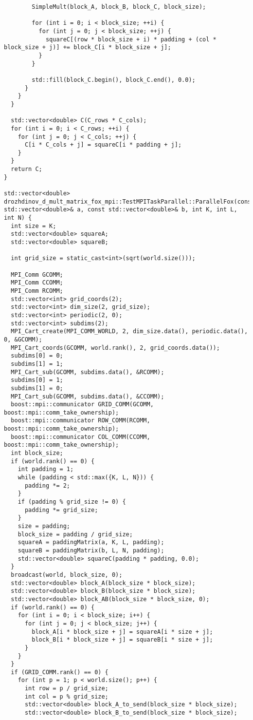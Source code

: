 \documentclass{report}
\begin{document}
\begin{lstlisting}
        SimpleMult(block_A, block_B, block_C, block_size);

        for (int i = 0; i < block_size; ++i) {
          for (int j = 0; j < block_size; ++j) {
            squareC[(row * block_size + i) * padding + (col * block_size + j)] += block_C[i * block_size + j];
          }
        }

        std::fill(block_C.begin(), block_C.end(), 0.0);
      }
    }
  }

  std::vector<double> C(C_rows * C_cols);
  for (int i = 0; i < C_rows; ++i) {
    for (int j = 0; j < C_cols; ++j) {
      C[i * C_cols + j] = squareC[i * padding + j];
    }
  }
  return C;
}

std::vector<double> drozhdinov_d_mult_matrix_fox_mpi::TestMPITaskParallel::ParallelFox(const std::vector<double>& a, const std::vector<double>& b, int K, int L, int N) {
  int size = K;
  std::vector<double> squareA;
  std::vector<double> squareB;

  int grid_size = static_cast<int>(sqrt(world.size()));

  MPI_Comm GCOMM;
  MPI_Comm CCOMM;
  MPI_Comm RCOMM;
  std::vector<int> grid_coords(2);
  std::vector<int> dim_size(2, grid_size);
  std::vector<int> periodic(2, 0);
  std::vector<int> subdims(2);
  MPI_Cart_create(MPI_COMM_WORLD, 2, dim_size.data(), periodic.data(), 0, &GCOMM);
  MPI_Cart_coords(GCOMM, world.rank(), 2, grid_coords.data());
  subdims[0] = 0;
  subdims[1] = 1;
  MPI_Cart_sub(GCOMM, subdims.data(), &RCOMM);
  subdims[0] = 1;
  subdims[1] = 0;
  MPI_Cart_sub(GCOMM, subdims.data(), &CCOMM);
  boost::mpi::communicator GRID_COMM(GCOMM, boost::mpi::comm_take_ownership);
  boost::mpi::communicator ROW_COMM(RCOMM, boost::mpi::comm_take_ownership);
  boost::mpi::communicator COL_COMM(CCOMM, boost::mpi::comm_take_ownership);
  int block_size;
  if (world.rank() == 0) {
    int padding = 1;
    while (padding < std::max({K, L, N})) {
      padding *= 2;
    }
    if (padding % grid_size != 0) {
      padding *= grid_size;
    }
    size = padding;
    block_size = padding / grid_size;
    squareA = paddingMatrix(a, K, L, padding);
    squareB = paddingMatrix(b, L, N, padding);
    std::vector<double> squareC(padding * padding, 0.0);
  }
  broadcast(world, block_size, 0);
  std::vector<double> block_A(block_size * block_size);
  std::vector<double> block_B(block_size * block_size);
  std::vector<double> block_AB(block_size * block_size, 0);
  if (world.rank() == 0) {
    for (int i = 0; i < block_size; i++) {
      for (int j = 0; j < block_size; j++) {
        block_A[i * block_size + j] = squareA[i * size + j];
        block_B[i * block_size + j] = squareB[i * size + j];
      }
    }
  }
  if (GRID_COMM.rank() == 0) {
    for (int p = 1; p < world.size(); p++) {
      int row = p / grid_size;
      int col = p % grid_size;
      std::vector<double> block_A_to_send(block_size * block_size);
      std::vector<double> block_B_to_send(block_size * block_size);


\end{lstlisting}
\end{document}
